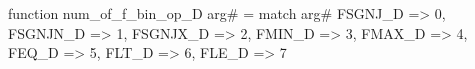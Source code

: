 function num_of_f_bin_op_D arg# = match arg# {
  FSGNJ_D => 0,
  FSGNJN_D => 1,
  FSGNJX_D => 2,
  FMIN_D => 3,
  FMAX_D => 4,
  FEQ_D => 5,
  FLT_D => 6,
  FLE_D => 7
}
